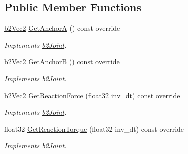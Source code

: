 \subsection*{Public Member Functions}
\begin{DoxyCompactItemize}
\item 
\mbox{\label{classb2_mouse_joint_a3c42531ac763bca3658a987d0ac7d2c4}} 
\hyperlink{structb2_vec2}{b2\+Vec2} \hyperlink{classb2_mouse_joint_a3c42531ac763bca3658a987d0ac7d2c4}{Get\+AnchorA} () const override
\begin{DoxyCompactList}\small\item\em Implements \hyperlink{classb2_joint}{b2\+Joint}. \end{DoxyCompactList}\item 
\mbox{\label{classb2_mouse_joint_adecfaff123ba199f9fc80be7fcb74af2}} 
\hyperlink{structb2_vec2}{b2\+Vec2} \hyperlink{classb2_mouse_joint_adecfaff123ba199f9fc80be7fcb74af2}{Get\+AnchorB} () const override
\begin{DoxyCompactList}\small\item\em Implements \hyperlink{classb2_joint}{b2\+Joint}. \end{DoxyCompactList}\item 
\mbox{\label{classb2_mouse_joint_a1af7bb9f41076b29a1ddefd7b6c2f27b}} 
\hyperlink{structb2_vec2}{b2\+Vec2} \hyperlink{classb2_mouse_joint_a1af7bb9f41076b29a1ddefd7b6c2f27b}{Get\+Reaction\+Force} (float32 inv\+\_\+dt) const override
\begin{DoxyCompactList}\small\item\em Implements \hyperlink{classb2_joint}{b2\+Joint}. \end{DoxyCompactList}\item 
\mbox{\label{classb2_mouse_joint_aa9ea0d1b1aa2db5be3ed63392a7e28a2}} 
float32 \hyperlink{classb2_mouse_joint_aa9ea0d1b1aa2db5be3ed63392a7e28a2}{Get\+Reaction\+Torque} (float32 inv\+\_\+dt) const override
\begin{DoxyCompactList}\small\item\em Implements \hyperlink{classb2_joint}{b2\+Joint}. \end{DoxyCompactList}\item 
\mbox{\label{classb2_mouse_joint_a96f34c1c990407eddbadf07ae359b1f3}} 

\end{DoxyCompactItemize}
